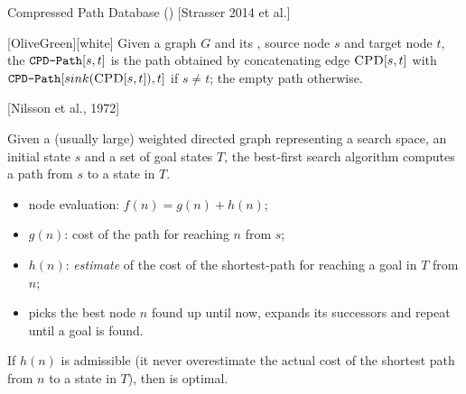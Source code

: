 \begin{frame}{Compressed Path Database (\CPD{}) [Strasser 2014 et al.]}
\begin{minipage}{0.50\textwidth}
\begin{center}
        \end{center}     
    \end{minipage}

    \vspace{-9pt}
    \begin{coloredBlock}{\CPDPathName{}}[OliveGreen][white]
        Given a graph $G$ and its \CPD{}, source node $s$ and target node $t$, 
        the $\texttt{CPD-Path}[\-s\-,\-t\-]$ is the path obtained by concatenating edge $\textsc{CPD}{}[s, t]$ with $\texttt{CPD-Path}[\-sink(\textsc{CPD}{}[s, t])\-,\-t\-]$ if $s \not = t$; the empty path otherwise.
    \end{coloredBlock}
\end{frame}

\begin{frame}{\A*{} [Nilsson et al., 1972]}
    \begin{block}{\A*{}}
        Given a (usually large) weighted directed graph representing a search space, an initial state $s$ and a set of goal states $T$, 
        the best-first search algorithm \A*{} computes a path from $s$ to a state in $T$.
    \end{block}

    \begin{itemize}
        \item node evaluation: $f(n) = g(n) + h(n)$;
        \item $g(n)$: cost of the path for reaching $n$ from $s$;
        \item $h(n)$: \textit{estimate} of the cost of the shortest-path for reaching a goal in $T$ from $n$;
        \item picks the best node $n$ found up until now, expands its successors and repeat until a goal is found.
    \end{itemize}

    \begin{block}{}
        If $h(n)$ is admissible (it never overestimate the actual cost of the shortest path from $n$ to a state in $T$), then \A*{} is optimal.
    \end{block}
\end{frame}